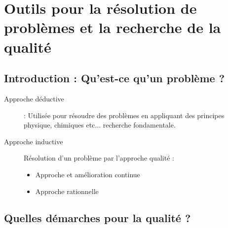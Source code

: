 \chapter{Outils pour la résolution de problèmes et la recherche de la qualité}

\section{Introduction : Qu’est-ce qu’un problème ?}

\begin{description}
	\item[Approche déductive] : Utilisée pour résoudre des problèmes en appliquant des principes physique, chimiques etc... recherche fondamentale.
	\item[Approche inductive] Résolution d’un problème par l'approche qualité :
	\begin{itemize}
		\item Approche et amélioration continue
		\item Approche rationnelle
	\end{itemize}
\end{description}

\section{Quelles démarches pour la qualité ?}

